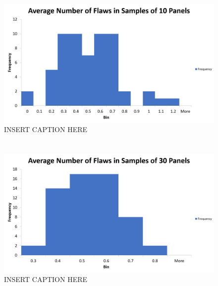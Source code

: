 \documentclass[letterpaper]{article}
\begin{document}
\begin{figure}[H]
 \centering
 \includegraphics[width=\textwidth]{q4.png}
 \caption{INSERT CAPTION HERE}
 \label{4c}
\end{figure}

\subsection{}%

\section{}%

\subsection{}%

\begin{figure}[H]
 \centering
 \includegraphics[width=\textwidth]{q5.png}
 \caption{INSERT CAPTION HERE}
 \label{5a}
\end{figure}

\subsection{}%
\end{document}
